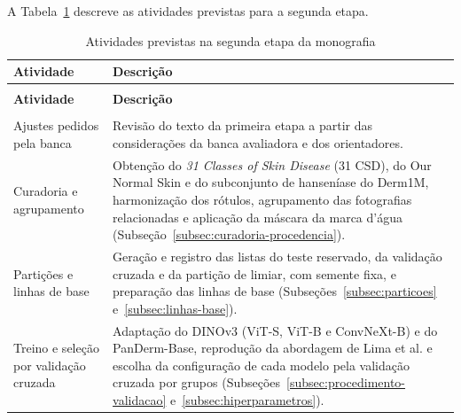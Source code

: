A Tabela~\ref{tab:atividades-segunda-etapa} descreve as atividades previstas
para a segunda etapa.

\begingroup
\footnotesize
\setlength{\tabcolsep}{4pt}
\setlength{\LTpost}{0pt}
\renewcommand{\arraystretch}{1.15}
\begin{longtable}{|>{\raggedright\arraybackslash}p{4.2cm}|>{\raggedright\arraybackslash}p{10.8cm}|}
	\caption{Atividades previstas na segunda etapa da monografia}\label{tab:atividades-segunda-etapa} \\
	\hline
	\textbf{Atividade}                       & \textbf{Descrição}                                     \\
	\hline
	\endfirsthead
	\multicolumn{2}{l}{\footnotesize\textit{Tabela~\ref{tab:atividades-segunda-etapa} (continuação)}} \\
	\hline
	\textbf{Atividade}                       & \textbf{Descrição}                                     \\
	\hline
	\endhead
	\hline
	\multicolumn{2}{r}{\footnotesize\textit{continua na próxima página}}                              \\
	\endfoot
	\hline
	\endlastfoot
	Ajustes pedidos pela banca               & Revisão do texto da primeira etapa a partir
	das considerações da banca avaliadora e dos orientadores.                                         \\
	\hline
	Curadoria e agrupamento                  & Obtenção do \textit{31 Classes of Skin Disease} (31 CSD), do Our Normal Skin e do subconjunto de hanseníase
	do Derm1M, harmonização dos rótulos, agrupamento das fotografias relacionadas
	e aplicação da máscara da marca d'água
	(Subseção~\ref{subsec:curadoria-procedencia}).                                                    \\
	\hline
	Partições e linhas de base               & Geração e registro das listas do teste reservado,
	da validação cruzada e da partição de limiar, com semente fixa, e preparação
	das linhas de base (Subseções~\ref{subsec:particoes} e~\ref{subsec:linhas-base}).                 \\
	\hline
	Treino e seleção por validação cruzada   & Adaptação do DINOv3 (ViT-S, ViT-B e
	ConvNeXt-B) e do PanDerm-Base, reprodução da abordagem de Lima et al. e escolha
	da configuração de cada modelo pela validação cruzada por grupos (Subseções~\ref{subsec:procedimento-validacao}
	e~\ref{subsec:hiperparametros}).                                                                  \\
	\hline

\end{longtable}
